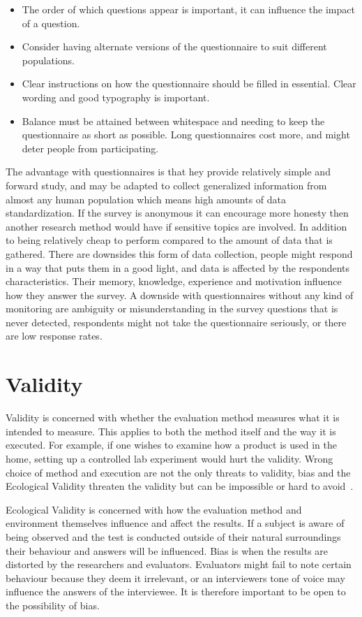 \begin{itemize}
  \item The order of which questions appear is important, it can influence the impact of a question.
  \item Consider having alternate versions of the questionnaire to suit different populations.
  \item Clear instructions on how the questionnaire should be filled in essential. Clear wording and good typography is important.
  \item Balance must be attained between whitespace and needing to keep the questionnaire as short as possible. Long questionnaires cost more, and might deter people from participating.
\end{itemize}

The advantage with questionnaires is that hey provide relatively simple and forward study, and may be adapted to collect generalized information from almost any human population which means high amounts of data standardization. If the survey is anonymous it can encourage more honesty then another research method would have if sensitive topics are involved. In addition to being relatively cheap to perform compared to the amount of data that is gathered. There are downsides this form of data collection, people might respond in a way that puts them in a good light, and data is affected by the respondents characteristics. Their memory, knowledge, experience and motivation influence how they answer the survey. A downside with questionnaires without any kind of monitoring are ambiguity or misunderstanding in the survey questions that is never detected, respondents might not take the questionnaire seriously, or there are low response rates.

\section{Validity}
Validity is concerned with whether the evaluation method measures what it is intended to measure. This applies to both the method itself and the way it is executed. For example, if one wishes to examine how a product is used in the home, setting up a controlled lab experiment would hurt the validity. Wrong choice of method and execution are not the only threats to validity, bias and the Ecological Validity threaten the validity but can be impossible or hard to avoid~\cite{interactionDesign}.

Ecological Validity is concerned with how the evaluation method and environment themselves influence and affect the results. If a subject is aware of being observed and the test is conducted outside of their natural surroundings their behaviour and answers will be influenced. Bias is when the results are distorted by the researchers and evaluators. Evaluators might fail to note certain behaviour because they deem it irrelevant, or an interviewers tone of voice may influence the answers of the interviewee. It is therefore important to be open to the possibility of bias.

